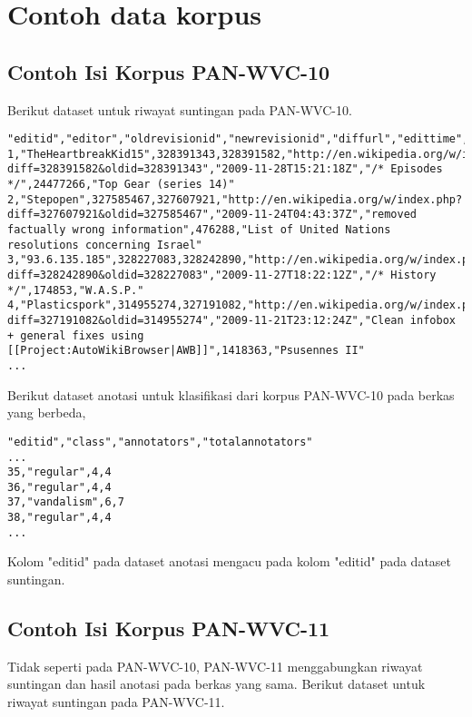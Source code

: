 \section{Contoh data korpus}
\label{appendix:korpus}

\subsection{Contoh Isi Korpus PAN-WVC-10}

Berikut dataset untuk riwayat suntingan pada PAN-WVC-10.

\begin{lstlisting}
"editid","editor","oldrevisionid","newrevisionid","diffurl","edittime","editcomment","articleid","articletitle"
1,"TheHeartbreakKid15",328391343,328391582,"http://en.wikipedia.org/w/index.php?diff=328391582&oldid=328391343","2009-11-28T15:21:18Z","/* Episodes */",24477266,"Top Gear (series 14)"
2,"Stepopen",327585467,327607921,"http://en.wikipedia.org/w/index.php?diff=327607921&oldid=327585467","2009-11-24T04:43:37Z","removed factually wrong information",476288,"List of United Nations resolutions concerning Israel"
3,"93.6.135.185",328227083,328242890,"http://en.wikipedia.org/w/index.php?diff=328242890&oldid=328227083","2009-11-27T18:22:12Z","/* History */",174853,"W.A.S.P."
4,"Plasticspork",314955274,327191082,"http://en.wikipedia.org/w/index.php?diff=327191082&oldid=314955274","2009-11-21T23:12:24Z","Clean infobox + general fixes using [[Project:AutoWikiBrowser|AWB]]",1418363,"Psusennes II"
...
\end{lstlisting}

Berikut dataset anotasi untuk klasifikasi dari korpus PAN-WVC-10 pada berkas yang berbeda,

\begin{lstlisting}
"editid","class","annotators","totalannotators"
...
35,"regular",4,4
36,"regular",4,4
37,"vandalism",6,7
38,"regular",4,4
...
\end{lstlisting}

Kolom "editid" pada dataset anotasi mengacu pada kolom "editid" pada dataset suntingan.

\newpage
\subsection{Contoh Isi Korpus PAN-WVC-11}

Tidak seperti pada PAN-WVC-10, PAN-WVC-11 menggabungkan riwayat suntingan dan hasil anotasi pada berkas yang sama.
Berikut dataset untuk riwayat suntingan pada PAN-WVC-11.

